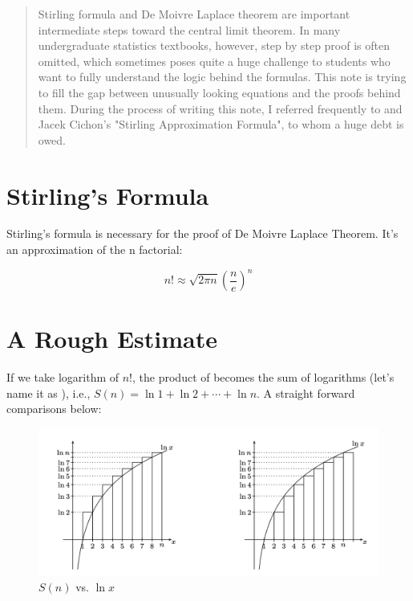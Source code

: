 \documentclass[11pt]{article}
\begin{document}
\begin{abstract}
Stirling formula and De Moivre Laplace theorem are important intermediate steps toward the central limit theorem.  In many undergraduate statistics textbooks,  however,  step by step proof is often omitted,  which sometimes poses quite a huge challenge to students who want to fully understand the logic behind the formulas.  This note is trying to fill the gap between unusually looking equations and the proofs behind them.  During the process of writing this note,  I referred frequently to \cite{balazs2014stirling} and Jacek Cichon's "Stirling Approximation Formula",  to whom a huge debt is owed.
\end{abstract}



\setcounter{figure}{0}

\vspace{10pt}


\section {\large Stirling's Formula}


Stirling's formula is necessary for the proof of De Moivre Laplace Theorem.  It's an approximation of the n factorial:

\begin{tcolorbox} 
[colback=blue!5!white,  colframe=blue!75!black,  title= {\textbf{
Stirling's Formula
} }]

$$ n! \approx \sqrt{ 2 \pi n} \left(  \frac{n}{e} \right) ^n $$

\end{tcolorbox}


\section {\large A Rough Estimate}

If we take  logarithm of $n!$,  the product of  becomes the sum of logarithms (let's name it as  ),  i.e.,  $ S(n) = \ln 1 + \ln 2 + \cdots + \ln n$.   A straight forward comparisons below:

\begin{figure}[H] 
\includegraphics [scale = 0.53] {comparison} %
\centering
\caption{$S(n)$ vs.  $\ln x$ }
\label{fig:f1}
\end{figure}
\end{document}
